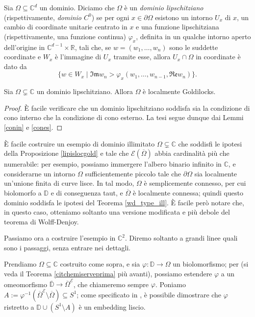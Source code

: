 \begin{defn}
    Sia $\Omega\subseteq\mathbb{C}^d$ un dominio. Diciamo che $\Omega$ è un \textit{dominio lipschitziano} (rispettivamente, \textit{dominio $C^0$}) se per ogni $x\in\partial\Omega$ esistono un intorno $U_x$ di $x$, un cambio di coordinate unitarie centrato in $x$ e una funzione lipschitziana (rispettivamente, una funzione continua) $\varphi_x$, definita in un qualche intorno aperto dell'origine in $\mathbb{C}^{d-1}\times\mathbb{R}$, tali che, se $w=(w_1,\dots,w_n)$ sono le suddette coordinate e $W_x$ è l'immagine di $U_x$ tramite esse, allora $U_x\cap\Omega$ in coordinate è dato da
    $$\{w\in W_x\mid \mathfrak{Im}w_n>\varphi_x(w_1,\dots,w_{n-1},\mathfrak{Re}w_n)\}.$$
\end{defn}

\begin{prop} \label{lipislocgold}
    Sia $\Omega\subsetneq\mathbb{C}$ un dominio lipschitziano. Allora $\Omega$ è localmente Goldilocks.
\end{prop}

\begin{proof}
    È facile verificare che un dominio lipschitziano soddisfa sia la condizione di cono interno che la condizione di cono esterno. La tesi segue dunque dai Lemmi \ref{conin} e \ref{cones}.
\end{proof}

È facile costruire un esempio di dominio illimitato $\Omega\subsetneq\mathbb{C}$ che soddisfi le ipotesi della Proposizione \ref{lipislocgold} e tale che $\mathcal{E}(\overline{\Omega})$ abbia cardinalità più che numerabile: per esempio, possiamo immergere l'albero binario infinito in $\mathbb{C}$, e considerarne un intorno $\Omega$ sufficientemente piccolo tale che $\partial\Omega$ sia localmente un'unione finita di curve lisce. In tal modo, $\Omega$ è semplicemente connesso, per cui biolomorfo a $\mathbb{D}$ e di conseguenza taut, e $\overline{\Omega}$ è localmente connessa; quindi questo dominio soddisfa le ipotesi del Teorema \ref{wd_type_ill}. È facile però notare che, in questo caso, otteniamo soltanto una versione modificata e più debole del teorema di Wolff-Denjoy.

Passiamo ora a costruire l'esempio in $\mathbb{C}^2$. Diremo soltanto a grandi linee quali sono i passaggi, senza entrare nei dettagli.

Prendiamo $\Omega\subseteq\mathbb{C}$ costruito come sopra, e sia $\varphi:\mathbb{D}\longrightarrow\Omega$ un biolomorfismo; per \cite[Theorem 1.9]{BZ2} (si veda il Teorema \ref{citchemiserveprima} più avanti), possiamo estendere $\varphi$ a un omeomorfismo $\overline{\mathbb{D}}\longrightarrow\overline{\Omega}^\mathcal{E}$, che chiameremo sempre $\varphi$. Poniamo ${A:=\varphi^{-1}(\overline{\Omega}^\mathcal{E}\setminus\overline{\Omega})\subseteq S^1}$; come specificato in \cite[Section 2.3]{BZ2}, è possibile dimostrare che $\varphi$ ristretto a $\mathbb{D}\cup(S^1\setminus A)$ è un embedding liscio.

